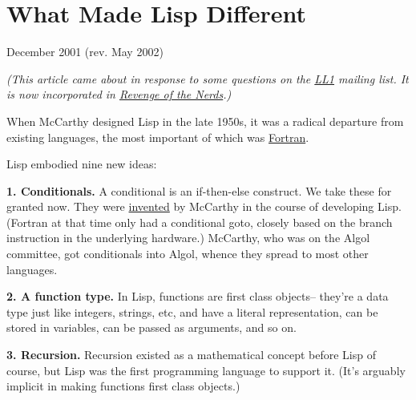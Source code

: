 \chapter{What Made Lisp Different}


            
              
                

December 2001 (rev. May 2002)
                  
                    \emph{(This article came about in response to some questions on
                      the \href{http://ll1.mit.edu}{LL1} mailing list. It
                      is now incorporated in
                      \href{http://www.paulgraham.com/icad.html}{Revenge of the Nerds}.)}

When McCarthy designed Lisp in the late 1950s,
                    it was a radical departure from existing languages, the most
                    important of which was
                    \href{http://www.paulgraham.com/history.html}{Fortran}.

Lisp embodied
                    nine new ideas:


                  


                  
                  \textbf{1. Conditionals.} A conditional is an if-then-else
                  construct. We take these for granted now. They were
                  \href{http://www-formal.stanford.edu/jmc/history/lisp/node2.html}{invented}
                  by McCarthy in the course of developing Lisp. (Fortran at that
                  time only had a conditional goto, closely based on the branch
                  instruction in the underlying hardware.) McCarthy, who was on
                  the Algol committee, got conditionals into Algol, whence they
                  spread to most other languages.

\textbf{2. A function type.}
                  In Lisp, functions are first class objects-- they're a data
                  type just like integers, strings, etc, and have a literal
                  representation, can be stored in variables, can be passed as
                  arguments, and so on.

\textbf{3. Recursion.}
                  Recursion existed as a mathematical concept before Lisp of
                  course, but Lisp was the first programming language to support
                  it. (It's arguably implicit in making functions first class
                  objects.)

